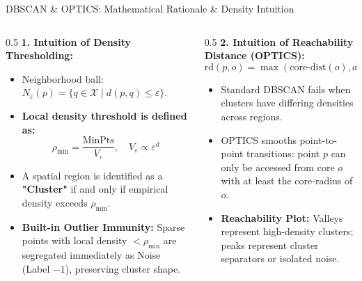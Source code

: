 \documentclass[aspectratio=169,10pt]{beamer}
\begin{document}
\begin{frame}{DBSCAN \& OPTICS: Mathematical Rationale \& Density Intuition}
  \small
  \begin{columns}[T]
    \begin{column}{0.5\textwidth}
      \textbf{1. Intuition of Density Thresholding:}
      \begin{itemize}\setlength{\itemsep}{1.5pt}
        \item Neighborhood ball: $N_\varepsilon(p) = \{q \in \mathcal{X} \mid d(p, q) \le \varepsilon\}$.
        \item \textbf{Local density threshold is defined as:}
          $$\rho_{\min} = \frac{\text{MinPts}}{V_\varepsilon}, \quad V_\varepsilon \propto \varepsilon^d$$
        \item A spatial region is identified as a \textbf{"Cluster"} if and only if empirical density exceeds $\rho_{\min}$.
        \item \textbf{Built-in Outlier Immunity:} Sparse points with local density $< \rho_{\min}$ are segregated immediately as Noise (Label $-1$), preserving cluster shape.
      \end{itemize}
    \end{column}
    \begin{column}{0.5\textwidth}
      \textbf{2. Intuition of Reachability Distance (OPTICS):}
      $$\text{rd}(p, o) = \max(\text{core-dist}(o), d(o, p))$$
      \begin{itemize}\setlength{\itemsep}{1.5pt}
        \item Standard DBSCAN fails when clusters have differing densities across regions.
        \item OPTICS smooths point-to-point transitions: point $p$ can only be accessed from core $o$ with at least the core-radius of $o$.
        \item \textbf{Reachability Plot:} Valleys represent high-density clusters; peaks represent cluster separators or isolated noise.
      \end{itemize}
    \end{column}
  \end{columns}
\end{frame}
\end{document}
